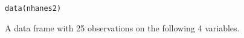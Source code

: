 \begin{Description}\relax
\end{Description}
\begin{Usage}
\begin{verbatim}data(nhanes2)\end{verbatim}
\end{Usage}
\begin{Format}\relax
A data frame with 25 observations on the following 4 variables.
\end{Format}
\begin{Source}\relax
\end{Source}

